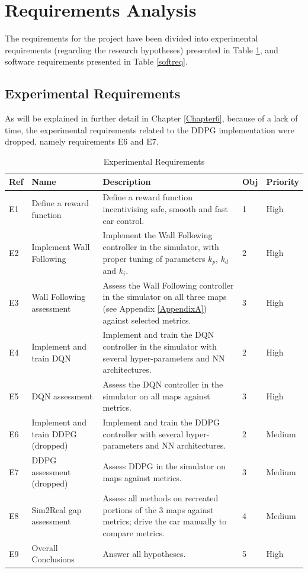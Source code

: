 \section{Requirements Analysis}
\label{reqana}
The requirements for the project have been divided into experimental requirements (regarding the research hypotheses) presented in Table \ref{expreqtab}, and software requirements presented in Table \ref{softreq}.
\subsection{Experimental Requirements}
\label{expreq}

As will be explained in further detail in Chapter \ref{Chapter6}, because of a lack of time, the experimental requirements related to the DDPG implementation were dropped, namely requirements E6 and E7.

\begin{table}
\centering
\begin{tabularx}{\textwidth}{||l|l|X|l|l||} 
 \hline
 Ref & Name & Description & Obj & Priority\\ [0.5ex]
 \hline\hline
 E1 & Define a reward function & Define a reward function incentivising safe, smooth and fast car control. & 1 & High \\
 \hline
 E2 & Implement Wall Following & Implement the Wall Following controller in the simulator, with proper tuning of parameters $k_p$, $k_d$ and $k_i$. & 2 & High \\
 \hline
 E3 & Wall Following assessment & Assess the Wall Following controller in the simulator on all three maps (see Appendix \ref{AppendixA}) against selected metrics. & 3 & High \\
 \hline
 E4 & Implement and train DQN & Implement and train the DQN controller in the simulator with several hyper-parameters and NN architectures. & 2 & High \\
 \hline
 E5 & DQN assessment & Assess the DQN controller in the simulator on all maps against metrics. & 3 & High \\ [1ex]
  \hline
 E6 & Implement and train DDPG (dropped) & Implement and train the DDPG controller with several hyper-parameters and NN architectures. & 2 & Medium \\
  \hline
 E7 & DDPG assessment (dropped) & Assess DDPG in the simulator on maps against metrics. & 3 & Medium \\ 
 \hline
 E8 & Sim2Real gap assessment & Assess all methods on recreated portions of the 3 maps against metrics; drive the car manually to compare metrics. & 4 & Medium \\
  \hline
 E9 & Overall Conclusions & Answer all hypotheses. & 5 & High \\ [1ex]
  \hline
\end{tabularx}
\caption{Experimental Requirements}
\label{expreqtab}
\end{table}


